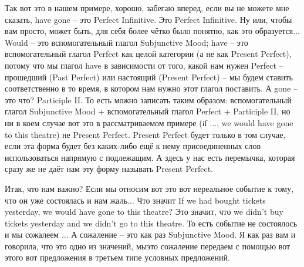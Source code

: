 \documentclass[main.tex]{subfiles}
\begin{document}
Так вот это в нашем примере, хорошо, забегаю вперед, если вы не можете мне сказать, have gone -- это Perfect Infinitive.
Это Perfect Infinitive.
Ну или, чтобы вам просто, может быть, для себя более чётко было понятно, как это образуется...
Would -- это вспомогательный глагол Subjunctive Mood;
have -- это вспомогательный глагол Perfect как целой категории (а не как Present Perfect), потому что мы глагол have в зависимости от того, какой нам нужен Perfect -- прошедший (Past Perfect) или настоящий (Present Perfect) -- мы будем ставить соответственно в то время, в котором нам нужно этот глагол поставить.
А gone -- это что?
Participle II.
То есть можно записать таким образом: вспомогательный глагол Subjunctive Mood + вспомогательный глагол Perfect + Participle II, но ни в коем случае вот это в рассматриваемом примере (if ..., we would have gone to this theatre) не Present Perfect.
Present Perfect будет только в том случае, если эта форма будет без каких-либо ещё к нему присоединенных слов использоваться напрямую с подлежащим.
А здесь у нас есть перемычка, которая сразу же не даёт нам эту форму называть Present Perfect.

Итак, что нам важно?
Если мы относим вот это вот нереальное событие к тому, что он уже состоялась и нам жаль...
Что значит If we had bought tickets yesterday, we would have gone to this theatre?
Это значит, что we didn't buy tickets yesterday and we didn't go to this theatre.
То есть событие не состоялось и мы сожалеем ...
А сожаление -- это как раз Subjunctive Mood.
Я как раз вам и говорила, что это одно из значений, мыэто сожаление передаем с помощью вот этого вот предложения в третьем типе условных предложений.
\end{document}
